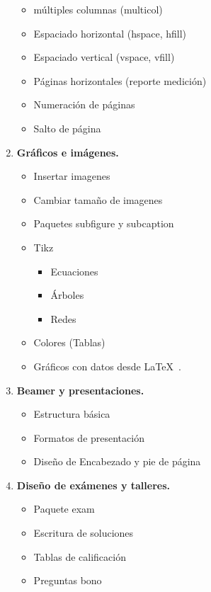 \documentclass[11pt]{article}
\begin{document}
\begin{multicols}{2}
\begin{enumerate}[start=1,label={\bfseries \arabic*.},leftmargin=1cm]
        \begin{itemize}
            \item múltiples columnas (multicol)
            \item Espaciado horizontal (hspace, hfill)
            \item Espaciado vertical (vspace, vfill)
            \item Páginas horizontales (reporte medición)
            \item Numeración de páginas
            \item Salto de página
        \end{itemize}
    \item \textbf{Gráficos e imágenes.}
        \begin{itemize}
            \item Insertar imagenes
            \item Cambiar tamaño de imagenes
            \item Paquetes subfigure y subcaption
            \item Tikz
            \begin{itemize}
                \item Ecuaciones
                \item Árboles
                \item Redes
            \end{itemize}
            \item Colores (Tablas)
            \item Gráficos con datos desde \LaTeX\ .
        \end{itemize}
    \item \textbf{Beamer y presentaciones.}
        \begin{itemize}
            \item Estructura básica
            \item Formatos de presentación
            \item Diseño de Encabezado y pie de página
        \end{itemize}
    \item \textbf{Diseño de exámenes y talleres.}
        \begin{itemize}
            \item Paquete exam
            \item Escritura de soluciones
            \item Tablas de calificación
            \item Preguntas bono

\end{itemize}
\end{enumerate}
\end{multicols}
\end{document}
